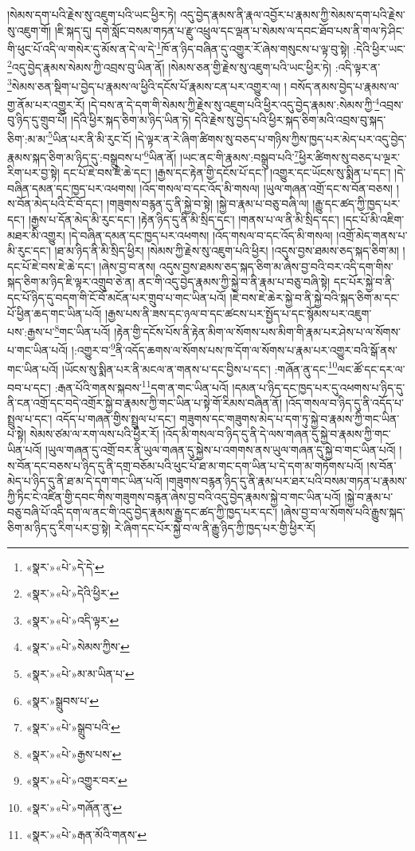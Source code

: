 །སེམས་དག་པའི་རྗེས་སུ་འཇུག་པའི་ཡང་ཕྱིར་ཏེ། འདུ་བྱེད་རྣམས་ནི་རྣལ་འབྱོར་པ་རྣམས་ཀྱི་སེམས་དག་པའི་རྗེས་སུ་འཇུག་གོ། །ཇི་སྐད་དུ། དགེ་སློང་བསམ་གཏན་པ་རྫུ་འཕྲུལ་དང་ལྡན་པ་སེམས་ལ་དབང་ཐོབ་པས་ནི་གལ་ཏེ་ཤིང་གི་ཕུང་པོ་འདི་ལ་གསེར་དུ་མོས་ན་དེ་ལ་དེ་\footnote{«སྣར་»«པེ་»དེ་དེ་}ཁོ་ན་ཉིད་བཞིན་དུ་འགྱུར་རོ་ཞེས་གསུངས་པ་ལྟ་བུ་སྟེ། :དེའི་ཕྱིར་ཡང་\footnote{«སྣར་»«པེ་»དེའི་ཕྱིར་}འདུ་བྱེད་རྣམས་སེམས་ཀྱི་འབྲས་བུ་ཡིན་ནོ། །སེམས་ཅན་གྱི་རྗེས་སུ་འཇུག་པའི་ཡང་ཕྱིར་ཏེ། :འདི་ལྟར་ན་\footnote{«སྣར་»«པེ་»འདི་ལྟར་}སེམས་ཅན་སྡིག་པ་བྱེད་པ་རྣམས་ལ་ཕྱིའི་དངོས་པོ་རྣམས་ངན་པར་འགྱུར་ལ། །
བསོད་ནམས་བྱེད་པ་རྣམས་ལ་གྱ་ནོམ་པར་འགྱུར་རོ། །དེ་བས་ན་དེ་དག་གི་སེམས་ཀྱི་རྗེས་སུ་འཇུག་པའི་ཕྱིར་འདུ་བྱེད་རྣམས་:སེམས་ཀྱི་\footnote{«སྣར་»«པེ་»སེམས་ཀྱིས་}འབྲས་བུ་ཉིད་དུ་གྲུབ་པོ། །དེའི་ཕྱིར་སྐད་ཅིག་མ་ཉིད་ཡིན་ཏེ། དེའི་རྗེས་སུ་བྱེད་པའི་ཕྱིར་སྐད་ཅིག་མའི་འབྲས་བུ་སྐད་ཅིག་:མ་མ་\footnote{«སྣར་»«པེ་»མ་མ་ཡིན་པ་}ཡིན་པར་ནི་མི་རུང་ངོ། །དེ་ལྟར་ན་རེ་ཞིག་ཚིགས་སུ་བཅད་པ་གཉིས་ཀྱིས་ཁྱད་པར་མེད་པར་འདུ་བྱེད་རྣམས་སྐད་ཅིག་མ་ཉིད་དུ་:བསྒྲུབས་པ་\footnote{«སྣར་»སྒྲུབས་པ་}ཡིན་ནོ། །ཡང་ནང་གི་རྣམས་:བསྒྲུབ་པའི་\footnote{«སྣར་»«པེ་»སྒྲུབ་པའི་}ཕྱིར་ཚིགས་སུ་བཅད་པ་ལྔར་རིག་པར་བྱ་སྟེ། དང་པོ་ཇེ་བས་ཇེ་ཆེ་དང་། །རྒྱས་དང་རྟེན་གྱི་དངོས་པོ་དང་། །འགྱུར་དང་ཡོངས་སུ་སྨིན་པ་དང་། །དེ་བཞིན་དམན་དང་ཁྱད་པར་འཕགས། །འོད་གསལ་བ་དང་འོད་མི་གསལ། །ཡུལ་གཞན་འགྲོ་དང་ས་བོན་བཅས། །ས་བོན་མེད་པའི་ངོ་བོ་དང་། །གཟུགས་བརྙན་དུ་ནི་སྐྱེ་བ་སྟེ། །སྐྱེ་བ་རྣམ་པ་བཅུ་བཞི་ལ། །རྒྱུ་དང་ཚད་ཀྱི་ཁྱད་པར་དང་། །རྒྱས་པ་དོན་མེད་མི་རུང་དང་། །རྟེན་ཉིད་དུ་ནི་མི་སྲིད་དང་། །གནས་པ་ལ་ནི་མི་སྲིད་དང་། །དང་པོ་མི་འཇིག་མཐར་མི་འགྱུར། །དེ་བཞིན་དམན་དང་ཁྱད་པར་འཕགས། །འོད་གསལ་བ་དང་འོད་མི་གསལ། །འགྲོ་མེད་གནས་པ་མི་རུང་དང་། །ཐ་མ་ཉིད་ནི་མི་སྲིད་ཕྱིར། །སེམས་ཀྱི་རྗེས་སུ་འཇུག་པའི་ཕྱིར། །འདུས་བྱས་ཐམས་ཅད་སྐད་ཅིག་མ། །དང་པོ་ཇེ་བས་ཇེ་ཆེ་དང་། །ཞེས་བྱ་བ་ནས། འདུས་བྱས་ཐམས་ཅད་སྐད་ཅིག་མ་ཞེས་བྱ་བའི་བར་འདི་དག་གིས་སྐད་ཅིག་མ་ཉིད་ཇི་ལྟར་འགྲུབ་ཅེ་ན། ནང་གི་འདུ་བྱེད་རྣམས་ཀྱི་སྐྱེ་བ་ནི་རྣམ་པ་བཅུ་བཞི་སྟེ། དང་པོར་སྐྱེ་བ་ནི་དང་པོ་ཉིད་དུ་བདག་གི་ངོ་བོ་མངོན་པར་གྲུབ་པ་གང་ཡིན་པའོ། །ཇེ་བས་ཇེ་ཆེར་སྐྱེ་བ་ནི་སྐྱེ་བའི་སྐད་ཅིག་མ་དང་པོ་ཕྱིན་ཆད་གང་ཡིན་པའོ། །རྒྱས་པས་ནི་ཟས་དང་ཉལ་བ་དང་ཚངས་པར་སྤྱོད་པ་དང་སྙོམས་པར་འཇུག་པས་:རྒྱས་པ་\footnote{«སྣར་»«པེ་»རྒྱས་པས་}གང་ཡིན་པའོ། །རྟེན་གྱི་དངོས་པོས་ནི་རྟེན་མིག་ལ་སོགས་པས་མིག་གི་རྣམ་པར་ཤེས་པ་ལ་སོགས་པ་གང་ཡིན་པའོ། །:འགྱུར་བ་\footnote{«སྣར་»«པེ་»འགྱུར་བར་}ནི་འདོད་ཆགས་ལ་སོགས་པས་ཁ་དོག་ལ་སོགས་པ་རྣམ་པར་འགྱུར་བའི་སྒོ་ནས་གང་ཡིན་པའོ། །ཡོངས་སུ་སྨིན་པར་ནི་མངལ་ན་གནས་པ་དང་བྱིས་པ་དང་། :གཞོན་ནུ་དང་\footnote{«སྣར་»«པེ་»གཞོན་ནུ་}ལང་ཚོ་དང་དར་ལ་བབ་པ་དང་། :རྒན་པོའི་གནས་སྐབས་\footnote{«སྣར་»«པེ་»རྒན་མོའི་གནས་}དག་ན་གང་ཡིན་པའོ། །དམན་པ་ཉིད་དང་ཁྱད་པར་དུ་འཕགས་པ་ཉིད་དུ་ནི་ངན་འགྲོ་དང་བདེ་འགྲོར་སྐྱེ་བ་རྣམས་ཀྱི་གང་ཡིན་པ་སྟེ་གོ་རིམས་བཞིན་ནོ། །འོད་གསལ་བ་ཉིད་དུ་ནི་འདོད་པ་སྤྲུལ་པ་དང་། འདོད་པ་གཞན་གྱིས་སྤྲུལ་པ་དང་། གཟུགས་དང་གཟུགས་མེད་པ་དག་ཏུ་སྐྱེ་བ་རྣམས་ཀྱི་གང་ཡིན་པ་སྟེ། སེམས་ཙམ་ལ་རག་ལས་པའི་ཕྱིར་རོ། །འོད་མི་གསལ་བ་ཉིད་དུ་ནི་དེ་ལས་གཞན་དུ་སྐྱེ་བ་རྣམས་ཀྱི་གང་ཡིན་པའོ། །ཡུལ་གཞན་དུ་འགྲོ་བར་ནི་ཡུལ་གཞན་དུ་སྐྱེས་པ་འགགས་ནས་ཡུལ་གཞན་དུ་སྐྱེ་བ་གང་ཡིན་པའོ། །ས་བོན་དང་བཅས་པ་ཉིད་དུ་ནི་དགྲ་བཅོམ་པའི་ཕུང་པོ་ཐ་མ་གང་དག་ཡིན་པ་དེ་དག་མ་གཏོགས་པའོ། །ས་བོན་མེད་པ་ཉིད་དུ་ནི་ཐ་མ་དེ་དག་གང་ཡིན་པའོ། །གཟུགས་བརྙན་ཉིད་དུ་ནི་རྣམ་པར་ཐར་པའི་བསམ་གཏན་པ་རྣམས་ཀྱི་ཏིང་ངེ་འཛིན་གྱི་དབང་གིས་གཟུགས་བརྙན་ཞེས་བྱ་བའི་འདུ་བྱེད་རྣམས་སྐྱེ་བ་གང་ཡིན་པའོ། །སྐྱེ་བ་རྣམ་པ་བཅུ་བཞི་པོ་འདི་དག་ལ་ནང་གི་འདུ་བྱེད་རྣམས་རྒྱུ་དང་ཚད་ཀྱི་ཁྱད་པར་དང་། །ཞེས་བྱ་བ་ལ་སོགས་པའི་རྒྱུས་སྐད་ཅིག་མ་ཉིད་དུ་རིག་པར་བྱ་སྟེ། རེ་ཞིག་དང་པོར་སྐྱེ་བ་ལ་ནི་རྒྱུ་ཉིད་ཀྱི་ཁྱད་པར་གྱི་ཕྱིར་རོ། 